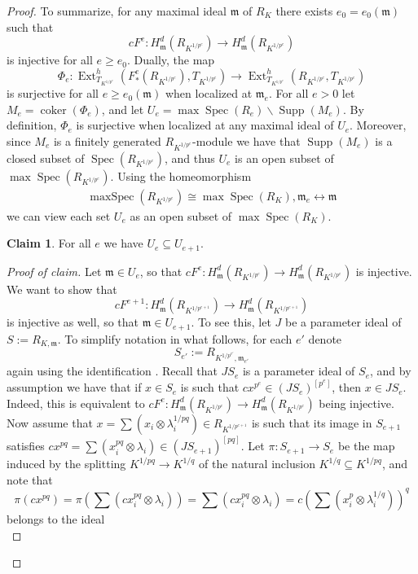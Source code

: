\documentclass[reqno,11pt]{amsart}
\makeatletter
\numberwithin{equation}{section}
\theoremstyle{definition}
\theoremstyle{definition}
\newtheorem{claim}[theorem]{Claim}
\theoremstyle{definition}
\theoremstyle{remark}
\newcommand{\Spec}{\operatorname{Spec}}
\newcommand{\maxSpec}{\operatorname{maxSpec}}
\newcommand{\Ext}{\operatorname{Ext}}
\newcommand{\Supp}{\operatorname{Supp}}
\newcommand{\coker}{\operatorname{coker}}
\newcommand{\fm}{\mathfrak{m}}
\renewcommand*{\eqref}[1]{
  \hyperref[{#1}]{\textup{\tagform@{\ref*{#1}}}}
}
\makeatother
\begin{document}
\begin{proof}
To summarize, for any maximal ideal $\fm$ of $R_K$ there exists $e_0=e_0(\fm)$ such that $$cF^{e}\colon  H^d_\fm(R_{K^{1/p^e}}) \to H^d_\fm(R_{K^{1/p^e}})$$ is injective for all $e \geq e_0$. Dually, the map 
$$\Phi_{e}\colon  \Ext^h_{T_{K^{1/p^e}}}(F^{e}_*(R_{K^{1/p^e}}),T_{K^{1/p^e}}) \to \Ext^h_{T_{K^{1/p^e}}}(R_{K^{1/p^e}},T_{K^{1/p^e}})$$ is surjective for all $e \geq e_0(\fm)$ when localized at $\fm_e$. 
For all $e>0$ let $M_{e} = \coker(\Phi_e)$, and let $U_{e} = \max\Spec(R_e) \smallsetminus \Supp(M_e)$. By definition, $\Phi_e$ is surjective when localized at any maximal ideal of $U_e$. Moreover, since $M_e$ is a finitely generated $R_{K^{1/p^e}}$-module we have that $\Supp(M_e)$ is a closed subset of $\Spec(R_{K^{1/p^e}})$, and thus $U_e$ is an open subset of $\max\Spec(R_{K^{1/p^e}})$. Using the homeomorphism
\begin{align}
\maxSpec(R_{K^{1/p^e}}) \cong \max\Spec(R_K),  \fm_e \longleftrightarrow \fm\label{lem: key lemma 2}
\end{align} we can view each set $U_e$ as an open subset of $\max\Spec(R_K)$. 
\begin{claim} For all $e$ we have $U_e \subseteq U_{e+1}$. 
\end{claim}
\begin{proof}[Proof of claim]
    Let $\fm \in U_e$, so that $cF^e\colon H^d_{\fm}(R_{K^{1/p^e}}) \to H^d_{\fm}(R_{K^{1/p^e}})$ is injective. We want to show that $$cF^{e+1}\colon H^d_\fm(R_{K^{1/p^{e+1}}}) \to H^d_\fm(R_{K^{1/p^{e+1}}})$$ is injective as well, so that $\fm \in U_{e+1}$. To see this, let $J$ be a parameter ideal of $S:=R_{K,\fm}$. To simplify notation in what follows, for each $e'$ denote $$S_{e'}:=R_{K^{1/p^{e'}},\fm_{e'}}$$ again using the identification \eqref{lem: key lemma 2}. Recall that $JS_e$ is a parameter ideal of $S_e$, and by assumption we have that if $x \in S_e$ is such that $cx^{p^e} \in (JS_e)^{[p^e]}$, then $x \in JS_e$. Indeed, this is equivalent to $cF^e\colon H^d_\fm(R_{K^{1/p^e}}) \to H^d_\fm(R_{K^{1/p^e}})$ being injective. Now assume that $x=\sum(x_i \otimes \lambda_i^{1/pq}) \in R_{K^{1/p^{e+1}}}$ is such that its image in $S_{e+1}$ satisfies $cx^{pq} = \sum (x_i^{pq} \otimes \lambda_i) \in (JS_{e+1})^{[pq]}$. Let $\pi\colon S_{e+1} \to S_e$ be the map induced by the splitting $K^{1/pq} \to K^{1/q}$ of the natural inclusion $K^{1/q} \subseteq K^{1/pq}$, and note that 
\[
\pi(cx^{pq}) = \pi(\sum (cx_i^{pq} \otimes \lambda_i)) = \sum (cx_i^{pq} \otimes \lambda_i) =  c \left(\sum (x_i^p \otimes \lambda_i^{1/q})\right)^q
\]
belongs to the ideal
\[
\]
\end{proof}
\end{proof}
\end{document}
